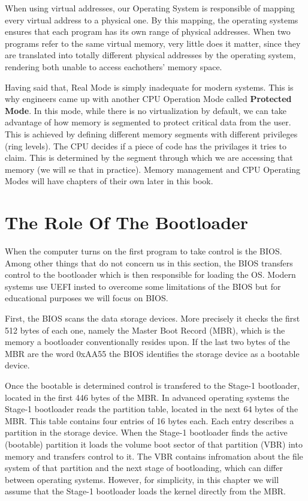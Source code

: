 When using virtual addresses, our Operating System is responsible of mapping every virtual address to a physical one.
By this mapping, the operating systems ensures that each program has its own range of physical addresses.
When two programs refer to the same virtual memory, very little does it matter, since they are translated into 
totally different physical addresses by the operating system, rendering both unable to access eachothers' memory space.

Having said that, Real Mode is simply inadequate for modern systems. This is why engineers came up with another CPU 
Operation Mode called \textbf{Protected Mode}. In this mode, while there is no virtualization by default, we can 
take advantage of how memory is segmented to protect critical data from the user. This is achieved by defining different 
memory segments with different privileges (ring levels). The CPU decides if a piece of code has the privilages 
it tries to claim. This is determined by the segment through which we are accessing that memory (we will se that in
practice). Memory management and CPU Operating Modes will have chapters of their own later in this book.

\section{The Role Of The Bootloader}

When the computer turns on the first program to take control is the BIOS. Among other things that do not concern us in 
this section, the BIOS transfers control to the bootloader which is then responsible for loading the OS. Modern systems 
use UEFI insted to overcome some limitations of the BIOS but for educational purposes we will focus on BIOS.

First, the BIOS scans the data storage devices. More precisely it checks the first 512 bytes of each one, namely the Master Boot Record 
(MBR), which is the memory a bootloader conventionally resides upon. If the last two bytes of the MBR are the word 0xAA55 the BIOS 
identifies the storage device as a bootable device.

Once the bootable is determined control is transfered to the Stage-1 bootloader, located in the first 446 bytes of the MBR.
In advanced operating systems the Stage-1 bootloader reads the partition table, located in the next 64 bytes of the MBR.
This table contains four entries of 16 bytes each. Each entry describes a partition in the storage device. When the Stage-1
bootloader finds the active (bootable) partition it loads the volume boot sector of that partition (VBR) into memory and transfers
control to it. The VBR contains infromation about the file system of that partition and the next stage of bootloading, which can differ
between operating systems. However, for simplicity, in this chapter we will assume that the Stage-1 bootloader loads the kernel directly 
from the MBR.


